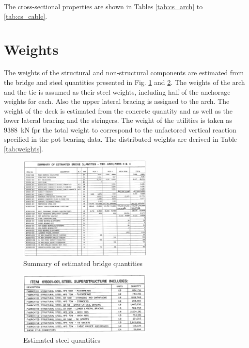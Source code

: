 The cross-sectional properties are shown in Tables \ref{tab:cs_arch} to \ref{tab:cs_cable}.






\section{Weights} \label{app:weight}
The weights of the structural and non-structural components are estimated from the bridge and steel quantities presented in Fig. \ref{fig:bridge_quantities} and \ref{fig:steel_quantities}. The weights of the arch and the tie is assumed as their steel weights, including half of the anchorage weights for each. Also the upper lateral bracing is assigned to the arch. The weight of the deck is estimated from the concrete quantity and as well as the lower lateral bracing and the stringers. The weight of the utilities is taken as \SI{9388}{kN} fpr the total weight to correspond to the unfactored vertical reaction specified in the pot bearing data. The distributed weights are derived in Table  \ref{tab:weights}.

\begin{figure}[H]
    \centering
    \includegraphics[trim={0 0 0 0},clip, width=0.6\textwidth]{overleaf/Appendix/Design drawings/estimated bridge quantities.PNG}
    \caption{Summary of estimated bridge quantities}
    \label{fig:bridge_quantities}
\end{figure}
\begin{figure}[H]
    \centering
    \includegraphics[trim={0 0 0 0},clip, width=0.6\textwidth]{overleaf/Appendix/Design drawings/Steel superstructure.PNG}
    \caption{Estimated steel quantities}
    \label{fig:steel_quantities}
\end{figure}

